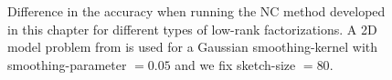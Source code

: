 \begin{figure}[ht]
    \centering
    
    \caption{Difference in the accuracy when running the \gls{NC} method developed in this
    chapter for different types of low-rank factorizations.
    A 2D model problem from 
    is used for a Gaussian \gls{smoothing-kernel} with \gls{smoothing-parameter} $=0.05$
    and we fix \gls{sketch-size} $=80$.}
    \label{fig:3-nystrom-other-approximations}
\end{figure}
